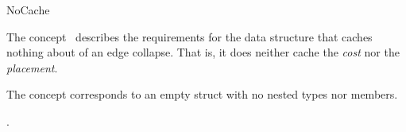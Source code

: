 
\begin{ccRefConcept}{NoCache}


\ccDefinition

The concept \ccRefName\ describes the requirements for the data
structure that caches nothing about of an edge collapse. That is, it
does neither cache the {\em cost} nor the {\em placement}.

The concept corresponds to an empty struct with no nested types nor members.

\ccRefines
{}

\ccHasModels

.

\end{ccRefConcept}

